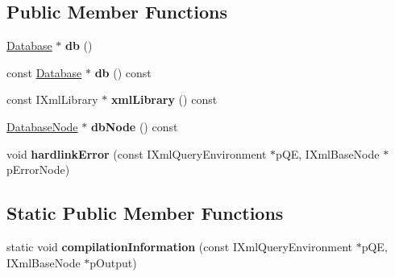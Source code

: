 \subsection*{\-Public \-Member \-Functions}
\begin{DoxyCompactItemize}
\item 
\hypertarget{classgeneral__server_1_1DatabaseNodeServerObject_a11e9af07fff09a64b2ac33beebbbf70c}{\hyperlink{classgeneral__server_1_1Database}{\-Database} $\ast$ {\bfseries db} ()}\label{classgeneral__server_1_1DatabaseNodeServerObject_a11e9af07fff09a64b2ac33beebbbf70c}

\item 
\hypertarget{classgeneral__server_1_1DatabaseNodeServerObject_a0a205eba7e980a35374e4e2ddceea688}{const \hyperlink{classgeneral__server_1_1Database}{\-Database} $\ast$ {\bfseries db} () const }\label{classgeneral__server_1_1DatabaseNodeServerObject_a0a205eba7e980a35374e4e2ddceea688}

\item 
\hypertarget{classgeneral__server_1_1DatabaseNodeServerObject_a6adf2fcfeb8168af69cf61a0e0386ff6}{const \-I\-Xml\-Library $\ast$ {\bfseries xml\-Library} () const }\label{classgeneral__server_1_1DatabaseNodeServerObject_a6adf2fcfeb8168af69cf61a0e0386ff6}

\item 
\hypertarget{classgeneral__server_1_1DatabaseNodeServerObject_a6b95cd9da2d5c865880440da999074f7}{\hyperlink{classgeneral__server_1_1DatabaseNode}{\-Database\-Node} $\ast$ {\bfseries db\-Node} () const }\label{classgeneral__server_1_1DatabaseNodeServerObject_a6b95cd9da2d5c865880440da999074f7}

\item 
\hypertarget{classgeneral__server_1_1DatabaseNodeServerObject_a3ee665b246b7bf0c967677cf39141169}{void {\bfseries hardlink\-Error} (const \-I\-Xml\-Query\-Environment $\ast$p\-Q\-E, \-I\-Xml\-Base\-Node $\ast$p\-Error\-Node)}\label{classgeneral__server_1_1DatabaseNodeServerObject_a3ee665b246b7bf0c967677cf39141169}

\end{DoxyCompactItemize}
\subsection*{\-Static \-Public \-Member \-Functions}
\begin{DoxyCompactItemize}
\item 
\hypertarget{classgeneral__server_1_1DatabaseNodeServerObject_ae3ec9adb6b3158992ac332dea5fbe132}{static void {\bfseries compilation\-Information} (const \-I\-Xml\-Query\-Environment $\ast$p\-Q\-E, \-I\-Xml\-Base\-Node $\ast$p\-Output)}\label{classgeneral__server_1_1DatabaseNodeServerObject_ae3ec9adb6b3158992ac332dea5fbe132}

\end{DoxyCompactItemize}
